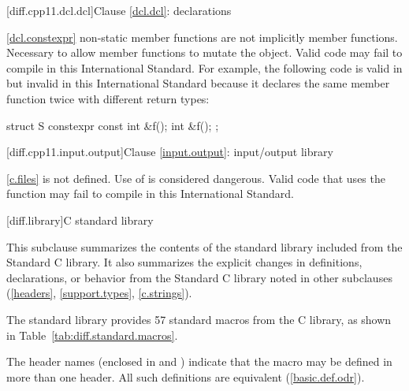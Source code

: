 [diff.cpp11.dcl.dcl]{Clause \ref{dcl.dcl}: declarations}

\ref{dcl.constexpr}
\change {} non-static member functions are not implicitly
 member functions.
\rationale Necessary to allow  member functions to mutate
the object.
\effect
Valid \CppXI code may fail to compile in this International Standard.
For example, the following code is valid in \CppXI
but invalid in this International Standard because it declares the same member
function twice with different return types:

\begin{codeblock}
struct S {
  constexpr const int &f();
  int &f();
};
\end{codeblock}

[diff.cpp11.input.output]{Clause \ref{input.output}: input/output library}

\ref{c.files}
\change {} is not defined.
\rationale Use of  is considered dangerous.
\effect
Valid \CppXI code that uses the  function may fail to compile
in this International Standard.

[diff.library]{C standard library}
%

\pnum
This subclause summarizes the contents of the \Cpp standard library
included from the Standard C library.
It also summarizes the explicit changes in definitions,
declarations, or behavior from the Standard C library
noted in other subclauses (\ref{headers}, \ref{support.types}, \ref{c.strings}).

\pnum
The \Cpp standard library provides 57 standard macros from the C library,
as shown in Table~\ref{tab:diff.standard.macros}.

\pnum
The header names (enclosed in
\tcode{<}
and
\tcode{>})
indicate that the macro may be defined in more than one header.
All such definitions are equivalent (\ref{basic.def.odr}).


